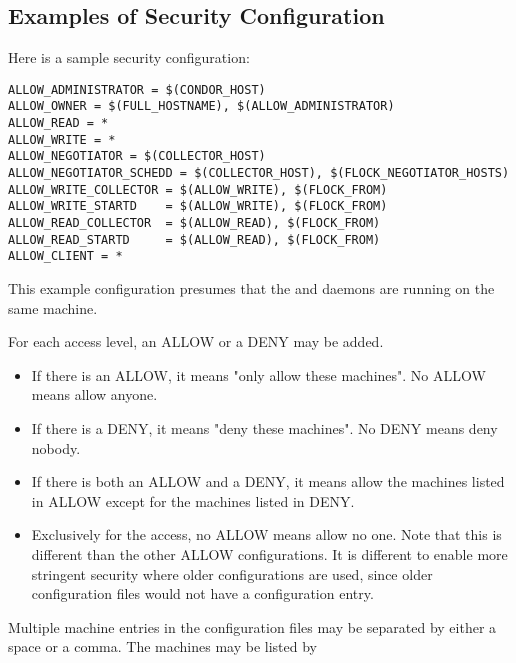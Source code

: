 \subsection{\label{sec:Example-Sec-Config}Examples of Security Configuration}

Here is a sample security configuration:
\footnotesize
\begin{verbatim}
ALLOW_ADMINISTRATOR = $(CONDOR_HOST)
ALLOW_OWNER = $(FULL_HOSTNAME), $(ALLOW_ADMINISTRATOR)
ALLOW_READ = *
ALLOW_WRITE = *
ALLOW_NEGOTIATOR = $(COLLECTOR_HOST)
ALLOW_NEGOTIATOR_SCHEDD = $(COLLECTOR_HOST), $(FLOCK_NEGOTIATOR_HOSTS)
ALLOW_WRITE_COLLECTOR = $(ALLOW_WRITE), $(FLOCK_FROM)
ALLOW_WRITE_STARTD    = $(ALLOW_WRITE), $(FLOCK_FROM)
ALLOW_READ_COLLECTOR  = $(ALLOW_READ), $(FLOCK_FROM)
ALLOW_READ_STARTD     = $(ALLOW_READ), $(FLOCK_FROM)
ALLOW_CLIENT = *
\end{verbatim}
\normalsize

This example configuration presumes that the 
and  daemons are running on the same machine.

For each access level, an ALLOW or a DENY may be added.
\begin{itemize}

\item If there is an ALLOW, it means "only allow these machines".  No
    ALLOW means allow anyone.

\item If there is a DENY, it means "deny these machines".  No DENY
    means deny nobody.

\item If there is both an ALLOW and a DENY, it means allow the
    machines listed in ALLOW except for the machines listed in DENY.

\item Exclusively for the  access,
    no ALLOW means allow no one.
    Note that this is different than the other ALLOW configurations.
    It is different to enable more stringent security where
    older configurations are used, since
    older configuration files would not have a 
     configuration entry.
\end{itemize}

Multiple machine entries
in the configuration files
may be separated by either a space or a comma.
The machines may be listed by

